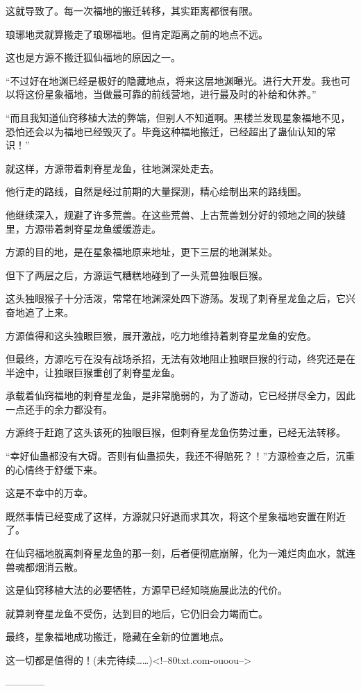 \begin{this_body}
这就导致了。每一次福地的搬迁转移，其实距离都很有限。

琅琊地灵就算搬走了琅琊福地。但肯定距离之前的地点不远。

这也是方源不搬迁狐仙福地的原因之一。

“不过好在地渊已经是极好的隐藏地点，将来这层地渊曝光。进行大开发。我也可以将这份星象福地，当做最可靠的前线营地，进行最及时的补给和休养。”

“而且我知道仙窍移植大法的弊端，但别人不知道啊。黑楼兰发现星象福地不见，恐怕还会以为福地已经毁灭了。毕竟这种福地搬迁，已经超出了蛊仙认知的常识！”

就这样，方源带着刺脊星龙鱼，往地渊深处走去。

他行走的路线，自然是经过前期的大量探测，精心绘制出来的路线图。

他继续深入，规避了许多荒兽。在这些荒兽、上古荒兽划分好的领地之间的狭缝里，方源带着刺脊星龙鱼缓缓游走。

方源的目的地，是在星象福地原来地址，更下三层的地渊某处。

但下了两层之后，方源运气糟糕地碰到了一头荒兽独眼巨猴。

这头独眼猴子十分活泼，常常在地渊深处四下游荡。发现了刺脊星龙鱼之后，它兴奋地追了上来。

方源值得和这头独眼巨猴，展开激战，吃力地维持着刺脊星龙鱼的安危。

但最终，方源吃亏在没有战场杀招，无法有效地阻止独眼巨猴的行动，终究还是在半途中，让独眼巨猴重创了刺脊星龙鱼。

承载着仙窍福地的刺脊星龙鱼，是非常脆弱的，为了游动，它已经拼尽全力，因此一点还手的余力都没有。

方源终于赶跑了这头该死的独眼巨猴，但刺脊星龙鱼伤势过重，已经无法转移。

“幸好仙蛊都没有大碍。否则有仙蛊损失，我还不得赔死？！”方源检查之后，沉重的心情终于舒缓下来。

这是不幸中的万幸。

既然事情已经变成了这样，方源就只好退而求其次，将这个星象福地安置在附近了。

在仙窍福地脱离刺脊星龙鱼的那一刻，后者便彻底崩解，化为一滩烂肉血水，就连兽魂都烟消云散。

这是仙窍移植大法的必要牺牲，方源早已经知晓施展此法的代价。

就算刺脊星龙鱼不受伤，达到目的地后，它仍旧会力竭而亡。

最终，星象福地成功搬迁，隐藏在全新的位置地点。

这一切都是值得的！(未完待续……)<!--80txt.com-ouoou-->

------------

\end{this_body}

